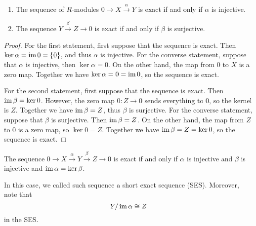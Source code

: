 \begin{pro}
    \hfill
    \begin{enumerate}
        \item The sequence of $R$-modules $0\to X\xrightarrow{\alpha} Y$ is exact if and only if $\alpha$ is injective.
        \item The sequence $Y\xrightarrow{\beta}Z\to 0$ is exact if and only if $\beta$ is surjective.
    \end{enumerate}
\end{pro}
\begin{proof}
    For the first statement, first suppose that the sequence is exact. Then $\ker\alpha = \operatorname{im} 0 = \left\{0\right\}$, and thus $\alpha$ is injective. For the converse statement, suppose that $\alpha$ is injective, then $\ker\alpha = 0$. On the other hand, the map from $0$ to $X$ is a zero map. Together we have $\ker\alpha = 0=\operatorname{im} 0$, so the sequence is exact.

    For the second statement, first suppose that the sequence is exact. Then $\operatorname{im} \beta = \ker 0$. However, the zero map $0:Z\to 0$ sends everything to $0$, so the kernel is $Z$. Together we have $\operatorname{im}\beta = Z$, thus $\beta$ is surjective. For the converse statement, suppose that $\beta$ is surjective. Then $\operatorname{im}\beta = Z$. On the other hand, the map from $Z$ to $0$ is a zero map, so $\ker 0 = Z$. Together we have $\operatorname{im} \beta =Z=\ker 0$, so the sequence is exact.
\end{proof}

\begin{cor}
    The sequence $0\to X\xrightarrow{\alpha}Y\xrightarrow{\beta}Z\to 0$ is exact if and only if $\alpha$ is injective and $\beta$ is injective and $\operatorname{im} \alpha = \ker \beta$. 
\end{cor}

\medskip

\begin{re}
    In this case, we called such sequence a short exact sequence (SES). Moreover, note that
    \[Y/\operatorname{im} \alpha \cong Z\]
    in the SES.
\end{re}

\medskip

